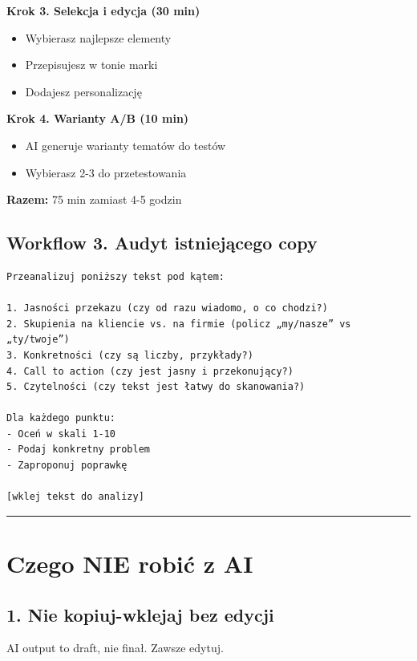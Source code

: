 \documentclass[
  12pt,
  a4paper,
  twoside,
  openright,
  12pt,
  DIV=12,
  BCOR=12mm]{scrbook}
\providecommand{\tightlist}{%
  \setlength{\itemsep}{0pt}\setlength{\parskip}{0pt}}\usepackage{longtable,booktabs,array}
\newcommand{\decoline}{%
  \begin{center}
    \textcolor{bordergray}{\rule{0.3\textwidth}{0.5pt}}
  \end{center}
}
\begin{document}
\textbf{Krok 3. Selekcja i edycja (30 min)}

\begin{itemize}
\tightlist
\item
  Wybierasz najlepsze elementy
\item
  Przepisujesz w tonie marki
\item
  Dodajesz personalizację
\end{itemize}

\textbf{Krok 4. Warianty A/B (10 min)}

\begin{itemize}
\tightlist
\item
  AI generuje warianty tematów do testów
\item
  Wybierasz 2-3 do przetestowania
\end{itemize}

\textbf{Razem:} 75 min zamiast 4-5 godzin

\subsection{Workflow 3. Audyt istniejącego
copy}\label{workflow-3.-audyt-istniejux105cego-copy}

\begin{verbatim}
Przeanalizuj poniższy tekst pod kątem:

1. Jasności przekazu (czy od razu wiadomo, o co chodzi?)
2. Skupienia na kliencie vs. na firmie (policz „my/nasze” vs „ty/twoje”)
3. Konkretności (czy są liczby, przykłady?)
4. Call to action (czy jest jasny i przekonujący?)
5. Czytelności (czy tekst jest łatwy do skanowania?)

Dla każdego punktu:
- Oceń w skali 1-10
- Podaj konkretny problem
- Zaproponuj poprawkę

[wklej tekst do analizy]
\end{verbatim}

\decoline

\section{Czego NIE robić z AI}\label{czego-nie-robiux107-z-ai}

\subsection{1. Nie kopiuj-wklejaj bez
edycji}\label{nie-kopiuj-wklejaj-bez-edycji}

AI output to draft, nie finał. Zawsze edytuj.
\end{document}
